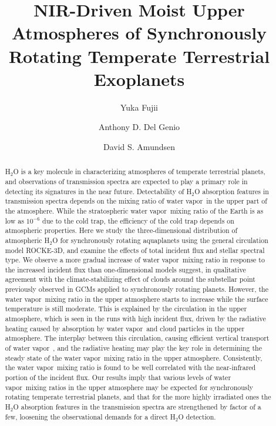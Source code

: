 \documentclass[11pt,numberedappendix,twocolappendix,]{emulateapj}
\def\water{H$_2$O }
\newcommand{\wv}{water vapor\ }
\begin{document}
\title{NIR-Driven Moist Upper Atmospheres of Synchronously Rotating Temperate Terrestrial Exoplanets}
\author{Yuka Fujii}


\author{Anthony D. Del Genio}

\author{David S. Amundsen}

\begin{abstract}

\water is a key molecule in characterizing atmospheres of temperate terrestrial planets, and observations of transmission spectra are expected to play a primary role in detecting its signatures in the near future. 
%
Detectability of \water absorption features in transmission spectra depends on the mixing ratio of \wv in the upper part of the atmosphere. 
%
While the stratospheric \wv mixing ratio of the Earth is as low as $10^{-6}$ due to the cold trap, the efficiency of the cold trap depends on atmospheric properties. 
%
Here we study the three-dimensional distribution of atmospheric \water for synchronously rotating aquaplanets using the general circulation model ROCKE-3D, and examine the effects of total incident flux and stellar spectral type.  
%
We observe a more gradual increase of \wv mixing ratio in response to the increased incident flux than one-dimensional models suggest, in qualitative agreement with the climate-stabilizing effect of clouds around the substellar point previously observed in GCMs applied to synchronously rotating planets. 
%
However, the \wv mixing ratio in the upper atmosphere starts to increase  while the surface temperature is still moderate. 
%
This is explained by the circulation in the upper atmosphere, which is seen in the runs with high incident flux, driven by the radiative heating caused by absorption by \wv and cloud particles in the upper atmosphere. 
%
The interplay between this circulation, causing efficient vertical transport of \wv, and the radiative heating may play the key role in determining the steady state of the \wv mixing ratio in the upper atmosphere. 
%
Consistently, the \wv mixing ratio is found to be well correlated with the near-infrared portion of the incident flux. 
%
Our results imply that various levels of \wv mixing ratios in the upper atmosphere may be expected for synchronously rotating temperate terrestrial planets, and that for the more highly irradiated ones the \water absorption features in the transmission spectra are strengthened by factor of a few, loosening the observational demands for a direct \water detection. 
%
\end{abstract}
\end{document}

